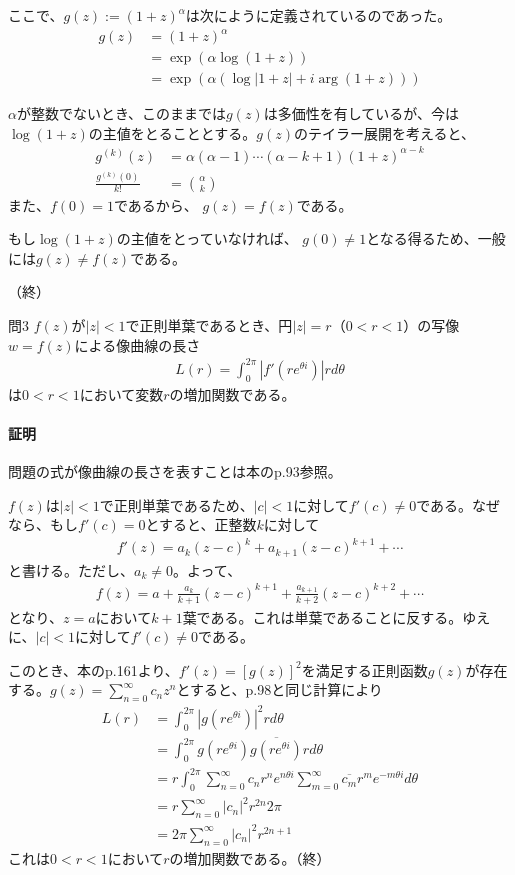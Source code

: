 ここで、$g(z):=(1+z)^\alpha$は次にように定義されているのであった。
\begin{align*}
    g(z)
    &=(1+z)^\alpha\\
    &=\exp(\alpha\log(1+z))\\
    &=\exp(\alpha(\log|1+z|+i\arg(1+z)))
\end{align*}

$\alpha$が整数でないとき、このままでは$g(z)$は多価性を有しているが、今は$\log(1+z)$の主値をとることとする。$g(z)$のテイラー展開を考えると、
\begin{align*}
    g^{(k)}(z)
    &=\alpha(\alpha-1)\cdots(\alpha-k+1)(1+z)^{\alpha-k}\\
    \frac{g^{(k)}(0)}{k!}&=\binom{\alpha}{k}
\end{align*}
また、$f(0)=1$であるから、
$g(z)=f(z)$である。

もし$\log(1+z)$の主値をとっていなければ、
$g(0)\neq1$となる得るため、一般には$g(z)\neq f(z)$である。

（終）

\newpage
\begin{mysimplebox}{問3}
$f(z)$が$|z|<1$で正則単葉であるとき、円$|z|=r$（$0<r<1$）の写像$w=f(z)$による像曲線の長さ
\begin{align*}
    L(r)=\int_{0}^{2\pi}|f'(re^{\theta i})|rd\theta
\end{align*}
は$0<r<1$において変数$r$の増加関数である。
\end{mysimplebox}
\paragraph{証明}
問題の式が像曲線の長さを表すことは本のp.93参照。

$f(z)$は$|z|<1$で正則単葉であるため、$|c|<1$に対して$f'(c)\neq0$である。なぜなら、もし$f'(c)=0$とすると、正整数$k$に対して
\begin{align*}
    f'(z)=a_k(z-c)^k+a_{k+1}(z-c)^{k+1}+\cdots
\end{align*}
と書ける。ただし、$a_k\neq0$。よって、
\begin{align*}
    f(z)=a+\frac{a_k}{k+1}(z-c)^{k+1}+\frac{a_{k+1}}{k+2}(z-c)^{k+2}+\cdots
\end{align*}
となり、$z=a$において$k+1$葉である。これは単葉であることに反する。ゆえに、$|c|<1$に対して$f'(c)\neq0$である。

このとき、本のp.161より、$f'(z)=[g(z)]^2$を満足する正則函数$g(z)$が存在する。$g(z)=\sum_{n=0}^{\infty}c_nz^n$とすると、p.98と同じ計算により
\begin{align*}
    L(r)
    &=\int_{0}^{2\pi}|g(re^{\theta i})|^2rd\theta\\
    &=\int_{0}^{2\pi}g(re^{\theta i})\overline{g(re^{\theta i})}rd\theta\\
    &=r\int_{0}^{2\pi}\sum_{n=0}^{\infty}c_nr^ne^{n\theta i}\sum_{m=0}^{\infty}\overline{c_m}r^me^{-m\theta i}d\theta\\
    &=r\sum_{n=0}^{\infty}|c_n|^2r^{2n}2\pi\\
    &=2\pi\sum_{n=0}^{\infty}|c_n|^2r^{2n+1}
\end{align*}
これは$0<r<1$において$r$の増加関数である。（終）

